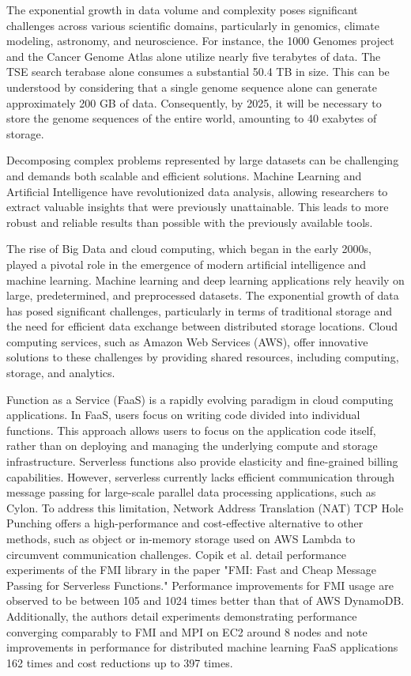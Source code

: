 \documentclass[conference]{IEEEtran}
\begin{document}
The exponential growth in data volume and complexity poses significant challenges across various scientific domains, particularly in genomics, climate modeling, astronomy, and neuroscience. For instance, the 1000 Genomes project and the Cancer Genome Atlas alone utilize nearly five terabytes of data\cite{McKenna2010The}. The TSE search terabase alone consumes a substantial 50.4 TB in size. This can be understood by considering that a single genome sequence alone can generate approximately 200 GB of data\cite{genomefaq:online}. Consequently, by 2025, it will be necessary to store the genome sequences of the entire world, amounting to 40 exabytes of storage.



Decomposing complex problems represented by large datasets can be challenging and demands both scalable and efficient solutions. Machine Learning and Artificial Intelligence have revolutionized data analysis, allowing researchers to extract valuable insights that were previously unattainable. This leads to more robust and reliable results than possible with the previously available tools.


The rise of Big Data and cloud computing, which began in the early 2000s, played a pivotal role in the emergence of modern artificial intelligence and machine learning. Machine learning and deep learning applications rely heavily on large, predetermined, and preprocessed datasets\cite{abeykoon2020data}. The exponential growth of data has posed significant challenges, particularly in terms of traditional storage and the need for efficient data exchange between distributed storage locations. Cloud computing services, such as Amazon Web Services (AWS), offer innovative solutions to these challenges by providing shared resources, including computing, storage, and analytics\cite{islamBigData}.

Function as a Service (FaaS) is a rapidly evolving paradigm in cloud computing applications. In FaaS, users focus on writing code divided into individual functions. This approach allows users to focus on the application code itself, rather than on deploying and managing the underlying compute and storage infrastructure. Serverless functions also provide elasticity and fine-grained billing capabilities. However, serverless currently lacks efficient communication through message passing for large-scale parallel data processing applications, such as Cylon\cite{copik2023fmi}. To address this limitation, Network Address Translation (NAT) TCP Hole Punching offers a high-performance and cost-effective alternative to other methods, such as object or in-memory storage used on AWS Lambda to circumvent communication challenges\cite{moyer2021punching}. Copik et al. detail performance experiments of the FMI library in the paper "FMI: Fast and Cheap Message Passing for Serverless Functions." Performance improvements for FMI usage are observed to be between 105 and 1024 times better than that of AWS DynamoDB. Additionally, the authors detail experiments demonstrating performance converging comparably to FMI and MPI on EC2  around 8 nodes and note improvements in performance for distributed machine learning FaaS applications 162 times and cost reductions up to 397 times\cite{copik2023fmi}.
\end{document}
